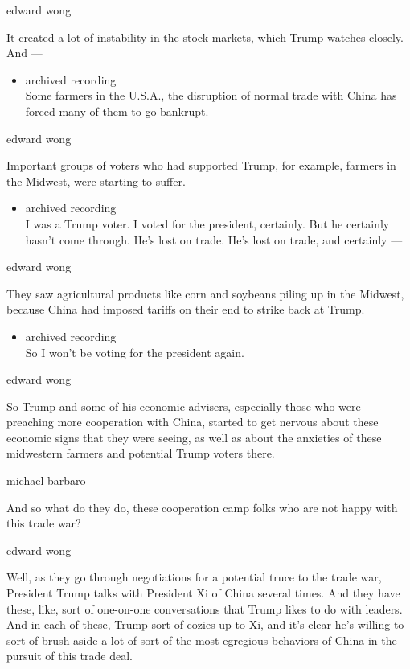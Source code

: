 edward wong

It created a lot of instability in the stock markets, which Trump
watches closely. And ---

\begin{itemize}
\tightlist
\item
  archived recording\\
  Some farmers in the U.S.A., the disruption of normal trade with China
  has forced many of them to go bankrupt.
\end{itemize}

edward wong

Important groups of voters who had supported Trump, for example, farmers
in the Midwest, were starting to suffer.

\begin{itemize}
\tightlist
\item
  archived recording\\
  I was a Trump voter. I voted for the president, certainly. But he
  certainly hasn't come through. He's lost on trade. He's lost on trade,
  and certainly ---
\end{itemize}

edward wong

They saw agricultural products like corn and soybeans piling up in the
Midwest, because China had imposed tariffs on their end to strike back
at Trump.

\begin{itemize}
\tightlist
\item
  archived recording\\
  So I won't be voting for the president again.
\end{itemize}

edward wong

So Trump and some of his economic advisers, especially those who were
preaching more cooperation with China, started to get nervous about
these economic signs that they were seeing, as well as about the
anxieties of these midwestern farmers and potential Trump voters there.

michael barbaro

And so what do they do, these cooperation camp folks who are not happy
with this trade war?

edward wong

Well, as they go through negotiations for a potential truce to the trade
war, President Trump talks with President Xi of China several times. And
they have these, like, sort of one-on-one conversations that Trump likes
to do with leaders. And in each of these, Trump sort of cozies up to Xi,
and it's clear he's willing to sort of brush aside a lot of sort of the
most egregious behaviors of China in the pursuit of this trade deal.

